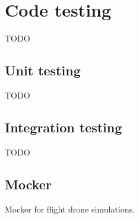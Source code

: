 \chapter{Code testing}\label{ch:code-testing}
TODO

\section{Unit testing}\label{sec:unit-testing}
TODO

\section{Integration testing}\label{sec:integration-testing}
TODO

\section{Mocker}\label{sec:mocker}
Mocker for flight drone simulations.